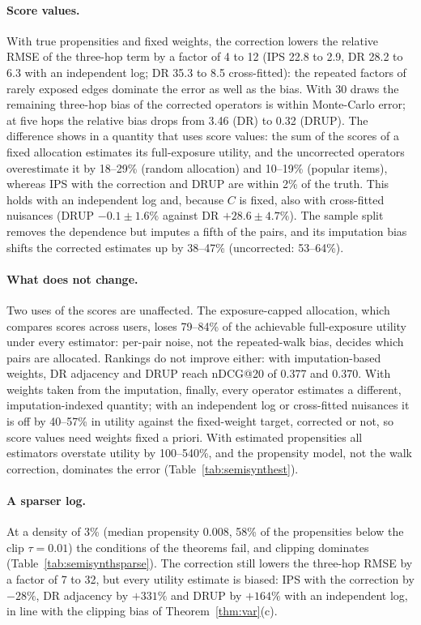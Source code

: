 \paragraph{Score values.} With true propensities and fixed weights, the
correction lowers the relative RMSE of the three-hop term by a factor of 4 to
12 (IPS 22.8 to 2.9, DR 28.2 to 6.3 with an independent log; DR 35.3 to 8.5
cross-fitted): the repeated factors of rarely exposed edges dominate the error
as well as the bias. With 30 draws the remaining three-hop bias of the
corrected operators is within Monte-Carlo error; at five hops the relative
bias drops from 3.46 (DR) to 0.32 (DRUP). The difference shows in a quantity
that uses score values: the sum of the scores of a fixed allocation estimates its
full-exposure utility, and the uncorrected operators overestimate it by 18--29\% (random allocation) and 10--19\% (popular items),
whereas IPS with the correction and DRUP are within 2\% of the truth. This
holds with an independent log and, because $C$ is fixed, also with
cross-fitted nuisances (DRUP $-0.1\pm1.6\%$ against DR $+28.6\pm4.7\%$). The
sample split removes the dependence but imputes a fifth of the pairs, and its
imputation bias shifts the corrected estimates up by 38--47\% (uncorrected:
53--64\%).

\paragraph{What does not change.} Two uses of the scores are unaffected. The
exposure-capped allocation, which compares scores across users, loses 79--84\%
of the achievable full-exposure utility under every estimator: per-pair noise,
not the repeated-walk bias, decides which pairs are allocated. Rankings do not
improve either: with imputation-based weights, DR adjacency and DRUP reach
nDCG@20 of 0.377 and 0.370. With weights taken from the imputation, finally,
every operator estimates a different, imputation-indexed quantity; with an
independent log or cross-fitted nuisances it is off by 40--57\% in utility
against the fixed-weight target, corrected or not, so score values need
weights fixed a priori. With estimated propensities all estimators
overstate utility by 100--540\%, and the propensity model, not the walk
correction, dominates the error (Table~\ref{tab:semisynthest}).

\paragraph{A sparser log.} At a density of 3\% (median propensity 0.008, 58\% of
the propensities below the clip $\tau=0.01$) the conditions of the theorems
fail, and clipping dominates (Table~\ref{tab:semisynthsparse}). The correction
still lowers the three-hop RMSE by a factor of 7 to 32, but every utility
estimate is biased: IPS with the correction by $-28\%$, DR adjacency by $+331\%$
and DRUP by $+164\%$ with an independent log, in line with the clipping bias of
Theorem~\ref{thm:var}(c).

